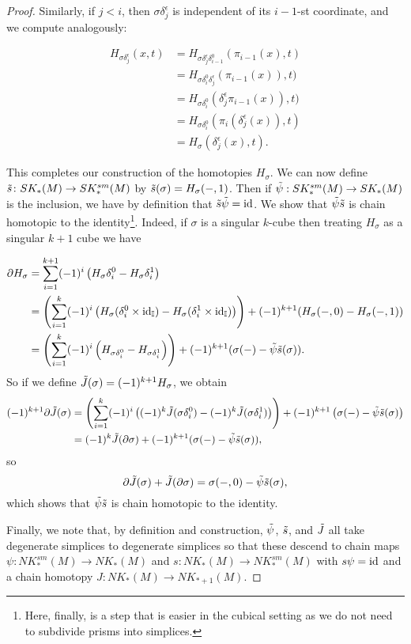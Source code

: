 \begin{proof}
	Similarly, if $j<i$, then $\sigma\delta_j^\epsilon$ is independent of its $i-1$-st coordinate, and we compute analogously:

	\begin{align*}
		H_{\sigma\delta_j^\epsilon}(x,t)& = H_{\sigma\delta_j^\epsilon \delta_{i-1}^0}(\pi_{i-1}(x),t)\\
		& = H_{\sigma \delta_{i}^0\delta_{j}^\epsilon}(\pi_{i-1}(x)),t)\\
		& = H_{\sigma \delta_{i}^0}(\delta_{j}^\epsilon\pi_{i-1}(x)),t)\\
		& = H_{\sigma \delta_{i}^0}(\pi_{i}(\delta_j^\epsilon(x)),t)\\
		& = H_\sigma(\delta_j^\epsilon(x),t).
	\end{align*}

	This completes our construction of the homotopies $H_\sigma$.
	We can now define $\tilde s \colon SK_*(M) \to SK^{sm}_*(M)$ by $\tilde s(\sigma) = H_\sigma(-,1)$.
	Then if $\tilde \psi: SK_*^{sm}(M) \to SK_*(M)$ is the inclusion, we have by definition that $\tilde s \tilde \psi = \mathrm{id}$.
	We show that $\tilde\psi\tilde s$ is chain homotopic to the identity\footnote{Here, finally, is a step that is easier in the cubical setting as we do not need to subdivide prisms into simplices.}.
	Indeed, if $\sigma$ is a singular $k$-cube then treating $H_\sigma$ as a singular $k+1$ cube we have

	\begin{align*}
		\partial H_\sigma& = \sum_{i = 1}^{k+1} (-1)^i\left(H_\sigma \delta_i^0-H_\sigma \delta^1_i\right)\\
		& = \left(\sum_{i = 1}^{k} (-1)^i\left(H_\sigma (\delta_i^0 \times \mathrm{id}_{\mathbb{I}})-H_\sigma (\delta^1_i \times \mathrm{id}_{\mathbb{I}})\right)\right) +(-1)^{k+1}(H_\sigma(-,0)-H_\sigma(-,1))\\
		& = \left(\sum_{i = 1}^{k} (-1)^i\left(H_{\sigma \delta_i^0}-H_{\sigma\delta^1_i}\right)\right) +(-1)^{k+1}(\sigma(-)-\tilde \psi\tilde s(\sigma)).
	\end{align*}
	So if we define $\tilde J(\sigma) = (-1)^{k+1}H_\sigma$, we obtain
	\begin{align*}
		(-1)^{k+1}\partial \tilde J(\sigma)& = \left(\sum_{i = 1}^{k} (-1)^i\left( (-1)^k\tilde J(\sigma \delta_i^0)-(-1)^k\tilde J(\sigma\delta^1_i)\right)\right) +(-1)^{k+1}\left(\sigma(-)-\tilde \psi\tilde s(\sigma)\right)\\
		& = (-1)^k\tilde J(\partial \sigma)+(-1)^{k+1}(\sigma(-)-\tilde \psi\tilde s(\sigma)),
	\end{align*}
	so $$\partial \tilde J(\sigma)+\tilde J(\partial \sigma) = \sigma(-,0)-\tilde \psi\tilde s(\sigma),$$
	which shows that $\tilde \psi\tilde s$ is chain homotopic to the identity.

	Finally, we note that, by definition and construction, $\tilde \psi$, $\tilde s$, and $\tilde J$ all take degenerate simplices to degenerate simplices so that these descend to chain maps $\psi \colon NK_*^{sm}(M) \to NK_*(M)$ and $s \colon NK_*(M) \to NK_*^{sm}(M)$ with $s\psi = \mathrm{id}$ and a chain homotopy $J \colon NK_*(M) \to NK_{*+1}(M)$.
\end{proof}